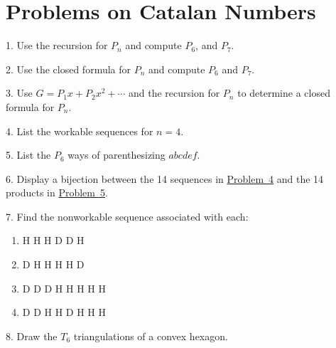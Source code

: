 \documentclass[10pt,]{book}
\theoremstyle{plain}
\theoremstyle{definition}
\theoremstyle{definition}
\numberwithin{equation}{chapter}
\begin{document}
\section[{Problems on Catalan Numbers}]{Problems on Catalan Numbers}\label{exercises-2}
\begin{exerciselist}
\item[1.]\hypertarget{exercise-24}{}\hypertarget{p-74}{}%
Use the recursion for \(P_{n}\) and compute \(P_{6}\), and \(P_{7}\).%
\par\smallskip
\item[2.]\hypertarget{exercise-25}{}\hypertarget{p-75}{}%
Use the closed formula for \(P_n\) and compute \(P_{6}\) and \(P_{7}\).%
\par\smallskip
\item[3.]\hypertarget{exercise-26}{}\hypertarget{p-76}{}%
Use \(G = P_{1}x + P_{2}x^{2} +\cdots\) and the recursion for \(P_{n}\) to determine a closed formula for \(P_{n}\).%
\par\smallskip
\item[4.]\hypertarget{prob-workseq}{}\hypertarget{p-77}{}%
List the workable sequences for \(n = 4\).%
\par\smallskip
\item[5.]\hypertarget{prob-parenth}{}\hypertarget{p-78}{}%
List the \(P_{6}\) ways of parenthesizing \(abcdef\).%
\par\smallskip
\item[6.]\hypertarget{exercise-29}{}\hypertarget{p-79}{}%
Display a bijection between the 14 sequences in \hyperlink{prob-workseq}{Problem~4} and the 14 products in \hyperlink{prob-parenth}{Problem~5}.%
\par\smallskip
\item[7.]\hypertarget{exercise-30}{}\hypertarget{p-80}{}%
Find the nonworkable sequence associated with each: \leavevmode%
\begin{enumerate}[label=(\alph*)]
\item\hypertarget{li-11}{}\hypertarget{p-81}{}%
H H H D D H%
\item\hypertarget{li-12}{}\hypertarget{p-82}{}%
D H H H H D%
\item\hypertarget{li-13}{}\hypertarget{p-83}{}%
D D D H H H H H%
\item\hypertarget{li-14}{}\hypertarget{p-84}{}%
D D H H D H H H%
\end{enumerate}
%
\par\smallskip
\item[8.]\hypertarget{exercise-31}{}\hypertarget{p-85}{}%
Draw the \(T_{6}\) triangulations of a convex hexagon.%

\end{exerciselist}
\end{document}
